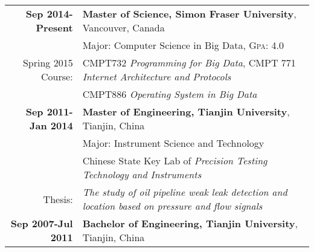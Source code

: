\documentclass[letterpaper,11pt]{article} %
\begin{document}
\begin{tabular}{rl}	
\textbf{Sep 2014-Present} & \textbf{Master of Science, Simon Fraser University}, Vancouver, Canada\\
& Major: Computer Science in Big Data, \textsc{Gpa}: 4.0\\
\small{Spring 2015 Course:} & CMPT732 \emph{Programming for Big Data},  CMPT 771 \emph{Internet Architecture and Protocols}\\
& CMPT886 \emph{Operating System in Big Data} \\




\textbf{Sep 2011-Jan 2014} & \textbf{Master of Engineering, Tianjin University}, Tianjin, China\\
& Major: Instrument Science and Technology\\
& Chinese State Key Lab of \emph{Precision Testing Technology and Instruments}\\
\small{Thesis:} & \small{\emph{The study of oil pipeline weak leak detection and location based on pressure and flow signals}}\\




\textbf{Sep 2007-Jul 2011} & \textbf{Bachelor of Engineering, Tianjin University}, Tianjin, China\\



\end{tabular}



\end{document}
